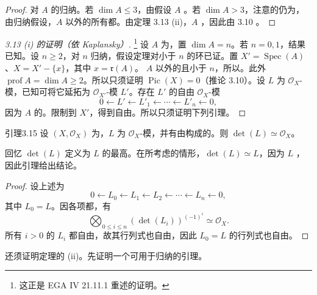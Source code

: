 \begin{proof}
对 $A$ 的归纳。若 $\dim A\leq3$，由假设 $A$ 。若 $\dim A>3$，注意的仍为，由归纳假设，$A$ 以外的所有都。由定理 3.13 (ii)，$A$ ，因此由 3.10 。
\end{proof}
\begin{proof}[3.13 (i) 的证明（依 Kaplansky）]
\footnote{这正是 EGA IV 21.11.1 重述的证明。}
设 $A$ 为，置 $\dim A=n$。若 $n=0,1$，结果已知。设 $n\geq2$，对 $n$ 归纳，假设定理对小于 $n$ 的环已证。置 $X'=\operatorname{Spec}(A)$、$X=X'-\{x\}$，其中 $x=\mathfrak r(A)$。
$A$ 以外的且小于 $n$，所以。此外 $\operatorname{prof}A=\dim A\geq2$。所以只须证明 $\operatorname{Pic}(X)=0$（推论 3.10）。设 $L$ 为 $\mathcal O_X$-模，已知可将它延拓为 $\mathcal O_{X'}$-模 $L'$。存在 $L'$ 的自由 $\mathcal O_X$-模
\[0\longleftarrow L'\longleftarrow L'_1\longleftarrow\cdots\longleftarrow L'_n\longleftarrow0,\]
因为 $A$ 的。限制到 $X'$，得到自由。所以只须证明下列引理。
\end{proof}
\begin{SGAresult}{引理}{3.15}
设 $(X,\mathcal O_X)$ 为，$L$ 为 $\mathcal O_X$-模，并有由构成的。则 $\det(L)\simeq\mathcal O_X$。
\end{SGAresult}
回忆 $\det(L)$ 定义为 $L$ 的最高。在所考虑的情形，$\det(L)\simeq L$，因为 $L$ ，因此引理给出结论。
\begin{proof}
设上述为
\[0\longleftarrow L_0\longleftarrow L_1\longleftarrow L_2\longleftarrow\cdots\longleftarrow L_n\longleftarrow0,\]
其中 $L_0=L$。因各项都，有
\[\bigotimes_{0\leq i\leq n}(\det(L_i))^{(-1)^i}\simeq\mathcal O_X.\]
所有 $i>0$ 的 $L_i$ 都自由，故其行列式也自由，因此 $L_0=L$ 的行列式也自由。
\end{proof}
还须证明定理的 (ii)。先证明一个可用于归纳的引理。
